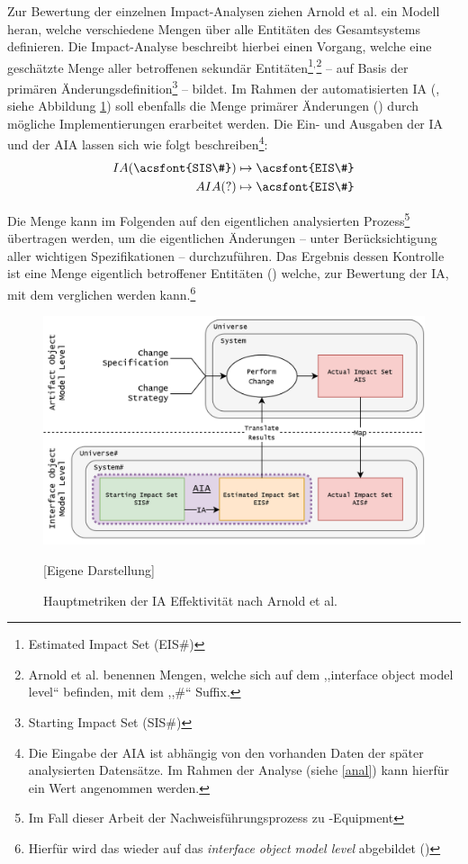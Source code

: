     Zur Bewertung der einzelnen Impact-Analysen ziehen Arnold et al. ein Modell heran, welche verschiedene Mengen über alle Entitäten des Gesamtsystems definieren.
    Die Impact-Analyse beschreibt hierbei einen Vorgang, welche eine geschätzte Menge aller betroffenen sekundär Entitäten\footnote{Estimated Impact Set (EIS\#)}$^,$\footnote{Arnold et al. benennen Mengen, welche sich auf dem ,,interface object model level`` befinden, mit dem ,,\#`` Suffix.} -- auf Basis der primären Änderungsdefinition\footnote{Starting Impact Set (SIS\#)} -- bildet.
    Im Rahmen der automatisierten \ac{IA} (, siehe Abbildung \ref{fig:aia}) soll ebenfalls die Menge primärer Änderungen () durch mögliche Implementierungen erarbeitet werden.
    Die Ein- und Ausgaben der \acf{IA} und der \acf{AIA} lassen sich wie folgt beschreiben\footnote{Die Eingabe der \ac{AIA} ist abhängig von den vorhanden Daten der später analysierten Datensätze. Im Rahmen der Analyse (siehe \ref{anal}) kann hierfür ein Wert angenommen werden.}:
    \begin{align}
        IA(\text{\acsfont{SIS\#}}) &\mapsto \text{\acsfont{EIS\#}} \\
        AIA(?)                     &\mapsto \text{\acsfont{EIS\#}}
    \end{align}
    
    \noindent
    Die  Menge kann im Folgenden auf den eigentlichen analysierten Prozess\footnote{Im Fall dieser Arbeit der Nachweisführungsprozess zu \atmans-Equipment} übertragen werden, um die eigentlichen Änderungen -- unter Berücksichtigung  aller wichtigen Spezifikationen -- durchzuführen.
    Das Ergebnis dessen Kontrolle ist eine Menge eigentlich betroffener Entitäten () welche, zur Bewertung der \ac{IA}, mit dem  verglichen werden kann.\footnote{Hierfür wird das  wieder auf das \textit{interface object model level} abgebildet ()}
    
    \begin{figure}[H]
        \centering
        \includegraphics[width=1\linewidth]{gfx/IA35.drawio.png}
        \caption{Hauptmetriken der \ac{IA} Effektivität nach Arnold et al. \cite[296]{app_bohner}}
        [Eigene Darstellung]
        \label{fig:aia}
    \end{figure}
    
